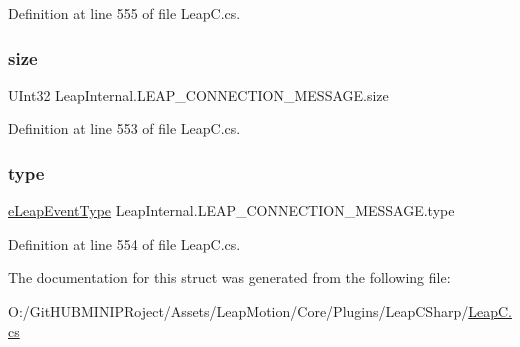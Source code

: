 Definition at line 555 of file Leap\+C.\+cs.

\mbox{\label{struct_leap_internal_1_1_l_e_a_p___c_o_n_n_e_c_t_i_o_n___m_e_s_s_a_g_e_aba211251d1fc15c5b5142d010672990f}} 
\subsubsection{\texorpdfstring{size}{size}}
{\footnotesize\ttfamily U\+Int32 Leap\+Internal.\+L\+E\+A\+P\+\_\+\+C\+O\+N\+N\+E\+C\+T\+I\+O\+N\+\_\+\+M\+E\+S\+S\+A\+G\+E.\+size}



Definition at line 553 of file Leap\+C.\+cs.

\mbox{\label{struct_leap_internal_1_1_l_e_a_p___c_o_n_n_e_c_t_i_o_n___m_e_s_s_a_g_e_ab87d60121e7d5cc24b3ac9a072b20e8d}} 
\subsubsection{\texorpdfstring{type}{type}}
{\footnotesize\ttfamily \mbox{\hyperlink{namespace_leap_internal_aa0ca3ef781ee69ce6a3cee33d6067d1a}{e\+Leap\+Event\+Type}} Leap\+Internal.\+L\+E\+A\+P\+\_\+\+C\+O\+N\+N\+E\+C\+T\+I\+O\+N\+\_\+\+M\+E\+S\+S\+A\+G\+E.\+type}



Definition at line 554 of file Leap\+C.\+cs.



The documentation for this struct was generated from the following file\+:\begin{DoxyCompactItemize}
\item 
O\+:/\+Git\+H\+U\+B\+M\+I\+N\+I\+P\+Roject/\+Assets/\+Leap\+Motion/\+Core/\+Plugins/\+Leap\+C\+Sharp/\mbox{\hyperlink{_leap_c_8cs}{Leap\+C.\+cs}}\end{DoxyCompactItemize}
